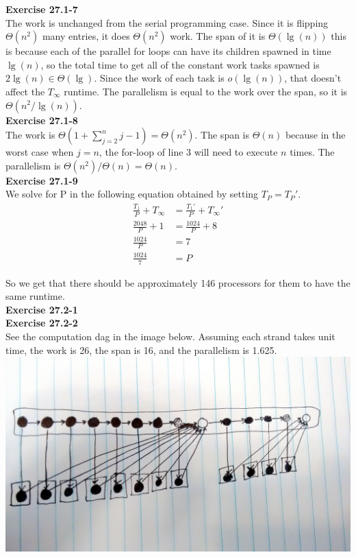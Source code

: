 \documentclass{article}
\begin{document}
\noindent\textbf{Exercise 27.1-7}\\

The work is unchanged from the serial programming case. Since it is flipping $\Theta(n^2)$ many entries, it does $\Theta(n^2)$ work. The span of it is $\Theta(\lg(n))$ this is because each of the parallel for loops can have its children spawned in time $\lg(n)$, so the total time to get all of the constant work tasks spawned is $2\lg(n) \in \Theta(\lg)$. Since the work of each task is $o(\lg(n))$, that doesn't affect the $T_\infty$ runtime. The parallelism is equal to the work over the span, so it is $\Theta(n^2/\lg(n))$.\\

\noindent\textbf{Exercise 27.1-8}\\

The work is $\Theta(1 + \sum_{j=2}^n j-1) = \Theta(n^2)$. The span is $\Theta(n)$ because in the worst case when $j=n$, the for-loop of line 3 will need to execute $n$ times.  The parallelism is $\Theta(n^2) / \Theta(n) = \Theta(n)$.\\

\noindent\textbf{Exercise 27.1-9}\\

We solve for P in the following equation obtained by setting $T_P = T_P'$.
\begin{align*}
\frac{T_1}{P}+T_\infty &= \frac{T_1'}{P} + T_\infty'\\
\frac{2048}{P} + 1 &= \frac{1024}{P}+8\\
\frac{1024}{P} &= 7\\
\frac{1024}{7} &=P
\end{align*}

So we get that there should be approximately 146 processors for them to have the same runtime.\\



\noindent\textbf{Exercise 27.2-1}\\


\noindent\textbf{Exercise 27.2-2}\\

See the computation dag in the image below.  Assuming each strand takes unit time, the work is 26, the span is 16, and the parallelism is 1.625.\\

\includegraphics[scale=.1]{MatMulRecDag}\\
\end{document}
